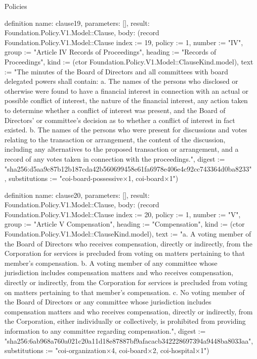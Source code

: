 \begin{lexlean}{Policies}
\begin{semanticmodule}
definition{
  name: clause19,
  parameters: [],
  result: Foundation.Policy.V1.Model::Clause,
  body: (record Foundation.Policy.V1.Model::Clause {index := 19, policy := 1, number := "IV", group := "Article IV Records of Proceedings", heading := "Records of Proceedings", kind := (ctor Foundation.Policy.V1.Model::ClauseKind.model), text := "The minutes of the Board of Directors and all committees with board delegated powers shall contain: a. The names of the persons who disclosed or otherwise were found to have a financial interest in connection with an actual or possible conflict of interest, the nature of the financial interest, any action taken to determine whether a conflict of interest was present, and the Board of Directors' or committee's decision as to whether a conflict of interest in fact existed. b. The names of the persons who were present for discussions and votes relating to the transaction or arrangement, the content of the discussion, including any alternatives to the proposed transaction or arrangement, and a record of any votes taken in connection with the proceedings.", digest := "sha256:d5aa9c87b12b187cda42b560699458e61fa6978e406e4c92cc743364d0ba8233", substitutions := "coi-board-possessive×1, coi-board×1"})
}

definition{
  name: clause20,
  parameters: [],
  result: Foundation.Policy.V1.Model::Clause,
  body: (record Foundation.Policy.V1.Model::Clause {index := 20, policy := 1, number := "V", group := "Article V Compensation", heading := "Compensation", kind := (ctor Foundation.Policy.V1.Model::ClauseKind.model), text := "a. A voting member of the Board of Directors who receives compensation, directly or indirectly, from the Corporation for services is precluded from voting on matters pertaining to that member's compensation. b. A voting member of any committee whose jurisdiction includes compensation matters and who receives compensation, directly or indirectly, from the Corporation for services is precluded from voting on matters pertaining to that member's compensation. c. No voting member of the Board of Directors or any committee whose jurisdiction includes compensation matters and who receives compensation, directly or indirectly, from the Corporation, either individually or collectively, is prohibited from providing information to any committee regarding compensation.", digest := "sha256:6ab968a760a021c20a11d18e87887bf9afacacb342228697394a9448ba8033aa", substitutions := "coi-organization×4, coi-board×2, coi-hospital×1"})
}


\end{semanticmodule}
\end{lexlean}
